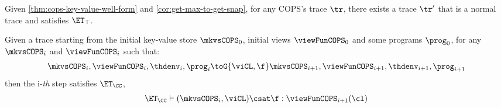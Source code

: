 Given \cref{thm:cops-key-value-well-form} and \cref{cor:get-max-to-get-snap}, for any COPS's trace \( \tr \), 
there exists a trace \( \tr' \) that is a normal trace and satisfies \( \ET_\top \).

\begin{theorem}
    \label{thm:cops-cc}
    Given a trace starting from the initial key-value store \( \mkvsCOPS_0 \), initial views \( \viewFunCOPS_0 \) and some programs \( \prog_0 \), for any \( \mkvsCOPS_i \) and \( \viewFunCOPS_i \)  such that: 
    \[
        \mkvsCOPS_i, \viewFunCOPS_i, \thdenv_i, \prog_i \toG{\viCL,\f} \mkvsCOPS_{i+1}, \viewFunCOPS_{i+1}, \thdenv_{i+1}, \prog_{i+1} 
    \]
    then the i-\emph{th} step satisfies \( \ET_\CC \), \ie
    \[
        \ET_\CC \vdash ( \mkvsCOPS_i, \viCL ) \csat \f : \viewFunCOPS_{i+1}(\cl)
    \]
\end{theorem}
